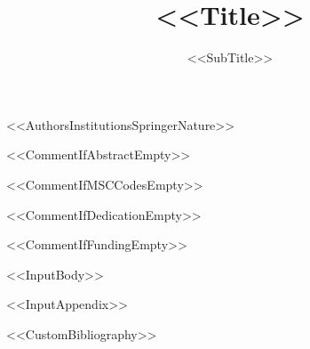 \documentclass[%
sn-mathphys-num,
<<DocumentClassOptions>>]{sn-jnl-scoop}
\begin{document}
\title[<<ShortTitle>>]{<<Title>>}
\subtitle{<<SubTitle>>}

<<AuthorsInstitutionsSpringerNature>>

<<CommentIfAbstractEmpty>>


<<CommentIfMSCCodesEmpty>>

<<CommentIfDedicationEmpty>>

<<CommentIfFundingEmpty>>

\maketitle

<<InputBody>>

\begin{appendices}
<<InputAppendix>>
\end{appendices}

<<CustomBibliography>>
\end{document}
